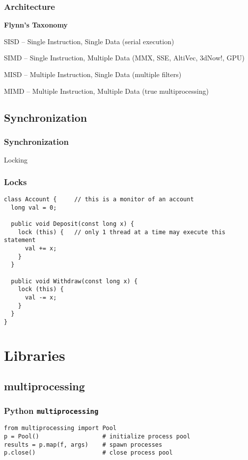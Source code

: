 \documentclass{beamer}
\begin{document}
\begin{frame}
\frametitle{Architecture}
\textbf{Flynn's Taxonomy}

SISD -- Single Instruction, Single Data
(serial execution)

SIMD -- Single Instruction, Multiple Data
(MMX, SSE, AltiVec, 3dNow!, GPU)

MISD -- Multiple Instruction, Single Data 
(multiple filters)

MIMD -- Multiple Instruction, Multiple Data
(true multiprocessing)

\end{frame}

\subsection{Synchronization}
\begin{frame}
\frametitle{Synchronization}

\pause

Locking
\end{frame}


\begin{frame}[fragile]
\frametitle{Locks}
\begin{verbatim}
class Account {     // this is a monitor of an account
  long val = 0;
 
  public void Deposit(const long x) {
    lock (this) {   // only 1 thread at a time may execute this statement
      val += x;
    }
  }
 
  public void Withdraw(const long x) {
    lock (this) {
      val -= x;
    }
  }
}
\end{verbatim}
\end{frame}

\section{Libraries}
\subsection{multiprocessing}
\begin{frame}[fragile]
\frametitle{Python \texttt{multiprocessing}}
\begin{verbatim}
from multiprocessing import Pool
p = Pool()                  # initialize process pool
results = p.map(f, args)    # spawn processes
p.close()                   # close process pool 
\end{verbatim}
\end{frame}
\end{document}
